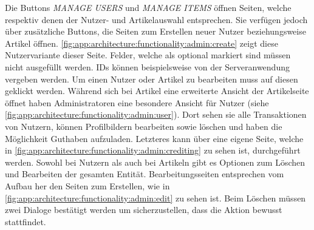 \documentclass[a4paper, 11pt]{article}
\begin{document}
Die Buttons \textit{MANAGE USERS} und \textit{MANAGE ITEMS} öffnen Seiten, welche respektiv denen der Nutzer- und Artikelauswahl entsprechen.
Sie verfügen jedoch über zusätzliche Buttons, die Seiten zum Erstellen neuer Nutzer beziehungsweise Artikel öffnen.
\autoref{fig:app:architecture:functionality:admin:create} zeigt diese Nutzervariante dieser Seite.
Felder, welche als optional markiert sind müssen nicht ausgefüllt werden.
IDs können beispielsweise von der Serveranwendung vergeben werden.
Um einen Nutzer oder Artikel zu bearbeiten muss auf diesen geklickt werden.
Während sich bei Artikel eine erweiterte Ansicht der Artikelseite öffnet haben Administratoren eine besondere Ansicht für Nutzer (siehe \autoref{fig:app:architecture:functionality:admin:user}).
Dort sehen sie alle Transaktionen von Nutzern, können Profilbildern bearbeiten sowie löschen und haben die Möglichkeit Guthaben aufzuladen.
Letzteres kann über eine eigene Seite, welche in \autoref{fig:app:architecture:functionality:admin:crediting} zu sehen ist, durchgeführt werden.
Sowohl bei Nutzern als auch bei Artikeln gibt es Optionen zum Löschen und Bearbeiten der gesamten Entität.
Bearbeitungsseiten entsprechen vom Aufbau her den Seiten zum Erstellen, wie in \autoref{fig:app:architecture:functionality:admin:edit} zu sehen ist.
Beim Löschen müssen zwei Dialoge bestätigt werden um sicherzustellen, dass die Aktion bewusst stattfindet.
\end{document}
